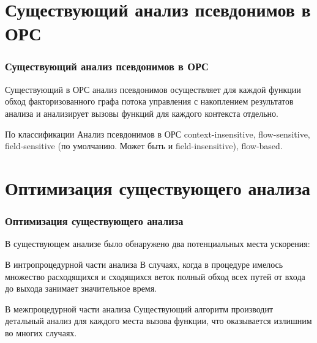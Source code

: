 \documentclass[utf8,russian]{beamer}
\begin{document}
\section{Существующий анализ псевдонимов в ОРС}

\begin{frame}
\frametitle{Существующий анализ псевдонимов в ОРС}

\begin{block}{}
Существующий в ОРС анализ псевдонимов осуществляет для каждой функции обход факторизованного графа потока управления с накоплением результатов анализа и анализирует вызовы функций для каждого контекста отдельно.
\end{block}

\begin{block}{По классификации}
Анализ псевдонимов в ОРС context-insensitive, flow-sensitive, field-sensitive (по умолчанию. Может быть и field-insensitive), flow-based.
\end{block}

\end{frame}

\section{Оптимизация существующего анализа}

\begin{frame}
\frametitle{Оптимизация существующего анализа}

\begin{block}{}
В существующем анализе было обнаружено два потенциальных места ускорения:
\end{block}

\begin{block}{В интропроцедурной части анализа}
В случаях, когда в процедуре имелось множество расходящихся и сходящихся веток полный обход всех путей от входа до выхода занимает значительное время.
\end{block}

\begin{block}{В межпроцедурной части анализа}
Существующий алгоритм производит детальный анализ для каждого места вызова функции, что оказывается излишним во многих случаях.
\end{block}

\end{frame}
\end{document}
